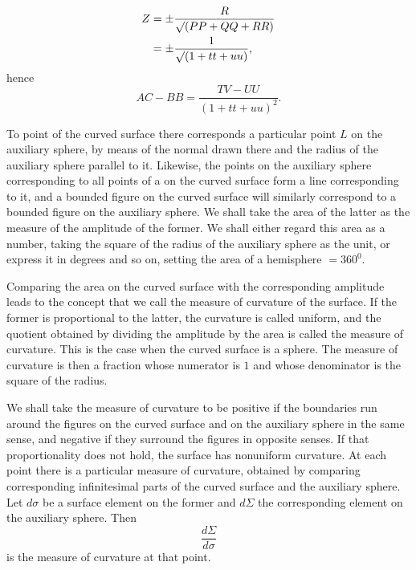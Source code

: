 %
\[
\begin{aligned}
Z&=\pm\frac{R}{\mathord{\surd}(PP+QQ+RR)}\\
&=\pm\frac{1}{\mathord{\surd}(1+tt+uu)},
\end{aligned}
\]
hence
\[
AC-BB=\frac{TV-UU}{(1+tt+uu)^{2}}.
\]

To  point of the curved surface there corresponds a particular point $L$ on the auxiliary sphere, by means of the normal drawn there and the radius of the auxiliary sphere parallel to it. Likewise, the points on the auxiliary sphere corresponding to all points of a  on the curved surface form a line corresponding to it, and a bounded figure on the curved surface will similarly correspond to a bounded figure on the auxiliary sphere. We shall take the area of the latter as the measure of the amplitude of the former. We shall either regard this area as a number, taking the square of the radius of the auxiliary sphere as the unit, or express it in degrees and so on, setting the area of a hemisphere $=360^{0}$.

Comparing the area on the curved surface with the corresponding amplitude leads to the concept that we call the measure of curvature of the surface. If the former is proportional to the latter, the curvature is called uniform, and the quotient obtained by dividing the amplitude by the area is called the measure of curvature. This is the case when the curved surface is a sphere. The measure of curvature is then a fraction whose numerator is $1$ and whose denominator is the square of the radius.

We shall take the measure of curvature to be positive if the boundaries run around the figures on the curved surface and on the auxiliary sphere in the same sense, and negative if they surround the figures in opposite senses. If that proportionality does not hold, the surface has nonuniform curvature. At each point there is a particular measure of curvature, obtained by comparing corresponding infinitesimal parts of the curved surface and the auxiliary sphere. Let $d\sigma$ be a surface element on the former and $d\Sigma$ the corresponding element on the auxiliary sphere. Then
\[
\frac{d\Sigma}{d\sigma}
\]
is the measure of curvature at that point.
